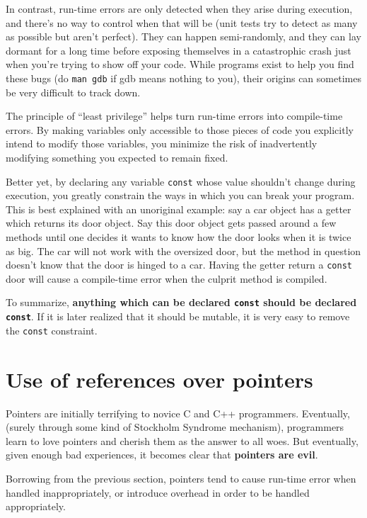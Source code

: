 \documentclass[10pt,a4paper]{book}
\begin{document}
In contrast, run-time errors are only detected when they arise during execution, and there's no way to control when that will be (unit tests try to detect as many as possible but aren't perfect). They can happen semi-randomly, and they can lay dormant for a long time before exposing themselves in a catastrophic crash just when you're trying to show off your code. While programs exist to help you find these bugs (do \Verb`man gdb` if gdb means nothing to you), their origins can sometimes be very difficult to track down.

The principle of ``least privilege'' helps turn run-time errors into compile-time errors. By making variables only accessible to those pieces of code you explicitly intend to modify those variables, you minimize the risk of inadvertently modifying something you expected to remain fixed.

Better yet, by declaring any variable \Verb`const` whose value shouldn't change during execution, you greatly constrain the ways in which you can break your program. This is best explained with an unoriginal example: say a car object has a getter which returns its door object. Say this door object gets passed around a few methods until one decides it wants to know how the door looks when it is twice as big. The car will not work with the oversized door, but the method in question doesn't know that the door is hinged to a car. Having the getter return a \Verb`const` door will cause a compile-time error when the culprit method is compiled.

To summarize, \textbf{anything which can be declared \Verb`const` should be declared \Verb`const`}. If it is later realized that it should be mutable, it is very easy to remove the \Verb`const` constraint.

\section{Use of references over pointers}

Pointers are initially terrifying to novice C and C++ programmers. Eventually, (surely through some kind of Stockholm Syndrome mechanism), programmers learn to love pointers and cherish them as the answer to all woes. But eventually, given enough bad experiences, it becomes clear that \textbf{pointers are evil}.

Borrowing from the previous section, pointers tend to cause run-time error when handled inappropriately, or introduce overhead in order to be handled appropriately.
\end{document}
